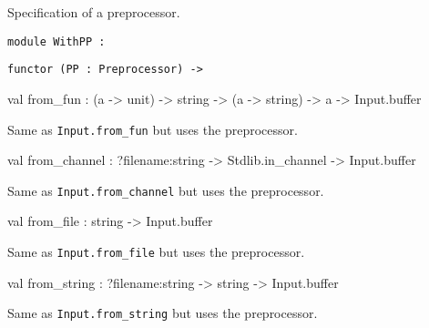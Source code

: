 \documentclass[11pt]{article}
\begin{document}
\begin{ocamldocdescription}
Specification of a preprocessor.


\end{ocamldocdescription}




\begin{ocamldoccode}
{\tt{module }}{\tt{WithPP}}{\tt{ : }}\end{ocamldoccode}
\label{module:Input.WithPP}

{\tt{functor (}}{\tt{PP}}{\tt{ : }}{\tt{Preprocessor}}{\tt{) -> }}\begin{ocamldocsigend}


\label{val:Input.WithPP.from-underscorefun}\begin{ocamldoccode}
val from_fun : ({\textquotesingle}a -> unit) -> string -> ({\textquotesingle}a -> string) -> {\textquotesingle}a -> Input.buffer
\end{ocamldoccode}
\begin{ocamldocdescription}
Same as {\tt{Input.from\_fun}} but uses the preprocessor.


\end{ocamldocdescription}


\label{val:Input.WithPP.from-underscorechannel}\begin{ocamldoccode}
val from_channel : ?filename:string -> Stdlib.in_channel -> Input.buffer
\end{ocamldoccode}
\begin{ocamldocdescription}
Same as {\tt{Input.from\_channel}} but uses the preprocessor.


\end{ocamldocdescription}


\label{val:Input.WithPP.from-underscorefile}\begin{ocamldoccode}
val from_file : string -> Input.buffer
\end{ocamldoccode}
\begin{ocamldocdescription}
Same as {\tt{Input.from\_file}} but uses the preprocessor.


\end{ocamldocdescription}


\label{val:Input.WithPP.from-underscorestring}\begin{ocamldoccode}
val from_string : ?filename:string -> string -> Input.buffer
\end{ocamldoccode}
\begin{ocamldocdescription}
Same as {\tt{Input.from\_string}} but uses the preprocessor.


\end{ocamldocdescription}
\end{ocamldocsigend}
\end{document}
